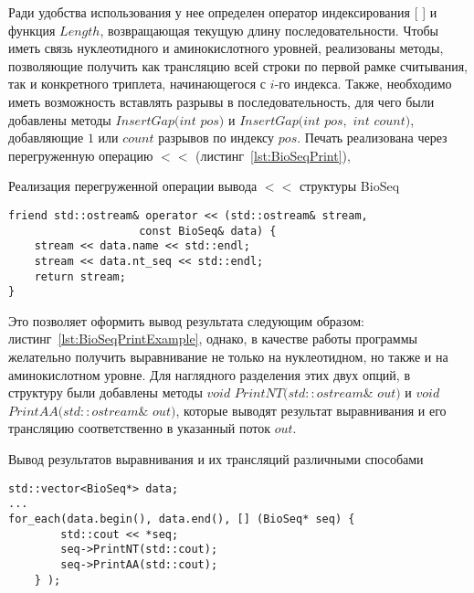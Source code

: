 Ради удобства использования у нее определен оператор индексирования [ ] и функция $Length$, возвращающая текущую длину последовательности. Чтобы иметь связь нуклеотидного и аминокислотного уровней, реализованы методы, позволяющие получить как трансляцию всей строки по первой рамке считывания, так и конкретного триплета, начинающегося с $i$-го индекса. Также, необходимо иметь возможность вставлять разрывы в последовательность, для чего были добавлены методы $InsertGap(int$ $pos)$ и $InsertGap(int$ $pos,$ $int$ $count)$, добавляющие $1$ или $count$ разрывов по индексу $pos$. Печать реализована через перегруженную операцию $<<$ (листинг~\ref{lst:BioSeqPrint}),
\begin{algorithm}
	\caption{Реализация перегруженной операции вывода $<<$ структуры BioSeq} \label{lst:BioSeqPrint}
	\begin{lstlisting}
friend std::ostream& operator << (std::ostream& stream, 
					const BioSeq& data) {
	stream << data.name << std::endl;
	stream << data.nt_seq << std::endl;
	return stream;
}
	\end{lstlisting}
\end{algorithm}

Это позволяет оформить вывод результата следующим образом: листинг~\ref{lst:BioSeqPrintExample}, однако, в качестве работы программы желательно получить выравнивание не только на нуклеотидном, но также и на аминокислотном уровне. Для наглядного разделения этих двух опций, в структуру были добавлены методы $void$ $PrintNT(std::ostream\&$ $out)$ и $void$ $PrintAA(std::ostream\&$ $out)$, которые выводят результат выравнивания и его трансляцию соответственно в указанный поток $out$.
\begin{algorithm}
	\caption{Вывод результатов выравнивания и их трансляций различными способами} \label{lst:BioSeqPrintExample}
	\begin{lstlisting}
std::vector<BioSeq*> data; 
...
for_each(data.begin(), data.end(), [] (BioSeq* seq) { 
		std::cout << *seq; 
		seq->PrintNT(std::cout);
		seq->PrintAA(std::cout);
	} );
	\end{lstlisting}
\end{algorithm}


